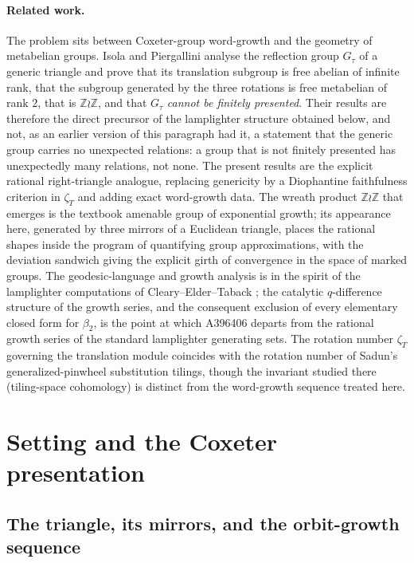 \documentclass[11pt]{article}
\theoremstyle{plain}
\theoremstyle{definition}
\theoremstyle{remark}
\newcommand{\Z}{\mathbb{Z}}
\begin{document}
\paragraph{Related work.}
The problem sits between Coxeter-group word-growth and the geometry of
metabelian groups. Isola and Piergallini \cite{IsolaPiergallini} analyse the reflection group
$G_\tau$ of a generic triangle and prove that its translation subgroup is free
abelian of infinite rank, that the subgroup generated by the three rotations is
free metabelian of rank $2$, that is $\mathbb{Z}\wr\mathbb{Z}$, and that
$G_\tau$ \emph{cannot be finitely presented}. Their results are therefore the
direct precursor of the lamplighter structure obtained below, and not, as an
earlier version of this paragraph had it, a statement that the generic group
carries no unexpected relations: a group that is not finitely presented has
unexpectedly many relations, not none. The present results are the explicit
rational right-triangle analogue, replacing genericity by a Diophantine
faithfulness criterion in $\zeta_T$ and adding exact word-growth data.
The wreath product $\Z\wr\Z$ that emerges is the textbook amenable
group of exponential growth; its appearance here, generated by three
mirrors of a Euclidean triangle, places the rational shapes inside the
program of quantifying group approximations, with the deviation sandwich
giving the explicit girth of convergence in the space of marked groups.
The geodesic-language and growth analysis is in the spirit of the
lamplighter computations of Cleary--Elder--Taback \cite{CET}; the catalytic
$q$-difference structure of the growth series, and the consequent
exclusion of every elementary closed form for $\beta_2$, is the point at
which A396406 departs from the rational growth series of the standard
lamplighter generating sets. The rotation number $\zeta_T$ governing the
translation module coincides with the rotation number of Sadun's \cite{Sadun}
generalized-pinwheel substitution tilings, though the invariant studied
there (tiling-space cohomology) is distinct from the word-growth
sequence treated here.

\section{Setting and the Coxeter presentation}
\label{sec:setting}

\subsection{The triangle, its mirrors, and the orbit-growth sequence}
\label{ssec:setting-defs}
\end{document}
